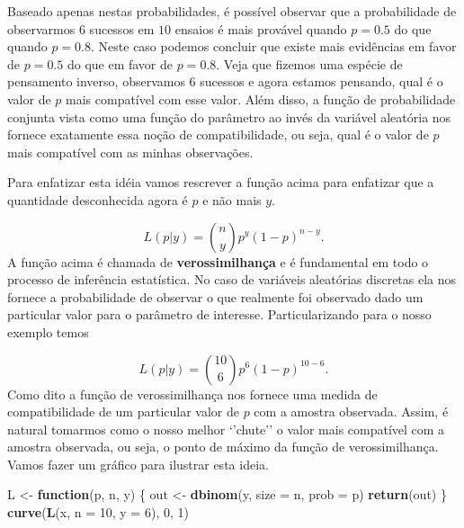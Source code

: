 \documentclass[10pt,a4paper]{book}
\newenvironment{Shaded}{\begin{snugshade}}{\end{snugshade}}
\newcommand{\KeywordTok}[1]{\textcolor[rgb]{0.13,0.29,0.53}{\textbf{#1}}}
\newcommand{\DataTypeTok}[1]{\textcolor[rgb]{0.13,0.29,0.53}{#1}}
\newcommand{\DecValTok}[1]{\textcolor[rgb]{0.00,0.00,0.81}{#1}}
\newcommand{\StringTok}[1]{\textcolor[rgb]{0.31,0.60,0.02}{#1}}
\newcommand{\ControlFlowTok}[1]{\textcolor[rgb]{0.13,0.29,0.53}{\textbf{#1}}}
\newcommand{\NormalTok}[1]{#1}
\begin{document}
Baseado apenas nestas probabilidades, é possível observar que a
probabilidade de observarmos \(6\) sucessos em \(10\) ensaios é mais
provável quando \(p = 0.5\) do que quando \(p = 0.8\). Neste caso
podemos concluir que existe mais evidências em favor de \(p=0.5\) do que
em favor de \(p = 0.8\). Veja que fizemos uma espécie de pensamento
inverso, observamos \(6\) sucessos e agora estamos pensando, qual é o
valor de \(p\) mais compatível com esse valor. Além disso, a função de
probabilidade conjunta vista como uma função do parâmetro ao invés da
variável aleatória nos fornece exatamente essa noção de compatibilidade,
ou seja, qual é o valor de \(p\) mais compatível com as minhas
observações.

Para enfatizar esta idéia vamos rescrever a função acima para enfatizar
que a quantidade desconhecida agora é \(p\) e não mais \(y\).

\[
L(p|y) = \binom{n}{y} p^y (1-p)^{n-y}.
\] A função acima é chamada de \textbf{verossimilhança} e é fundamental
em todo o processo de inferência estatística. No caso de variáveis
aleatórias discretas ela nos fornece a probabilidade de observar o que
realmente foi observado dado um particular valor para o parâmetro de
interesse. Particularizando para o nosso exemplo temos

\[
L(p|y) = \binom{10}{6} p^6 (1-p)^{10-6}.
\] Como dito a função de verossimilhança nos fornece uma medida de
compatibilidade de um particular valor de \(p\) com a amostra observada.
Assim, é natural tomarmos como o nosso melhor `'chute'' o valor mais
compatível com a amostra observada, ou seja, o ponto de máximo da função
de verossimilhança. Vamos fazer um gráfico para ilustrar esta ideia.

\begin{Shaded}
\begin{Highlighting}[]
\NormalTok{L <-}\StringTok{ }\ControlFlowTok{function}\NormalTok{(p, n, y) \{}
\NormalTok{  out <-}\StringTok{ }\KeywordTok{dbinom}\NormalTok{(y, }\DataTypeTok{size =}\NormalTok{ n, }\DataTypeTok{prob =}\NormalTok{ p)}
  \KeywordTok{return}\NormalTok{(out)}
\NormalTok{\}}
\KeywordTok{curve}\NormalTok{(}\KeywordTok{L}\NormalTok{(x, }\DataTypeTok{n =} \DecValTok{10}\NormalTok{, }\DataTypeTok{y =} \DecValTok{6}\NormalTok{), }\DecValTok{0}\NormalTok{, }\DecValTok{1}\NormalTok{)}
\end{Highlighting}
\end{Shaded}
\end{document}
